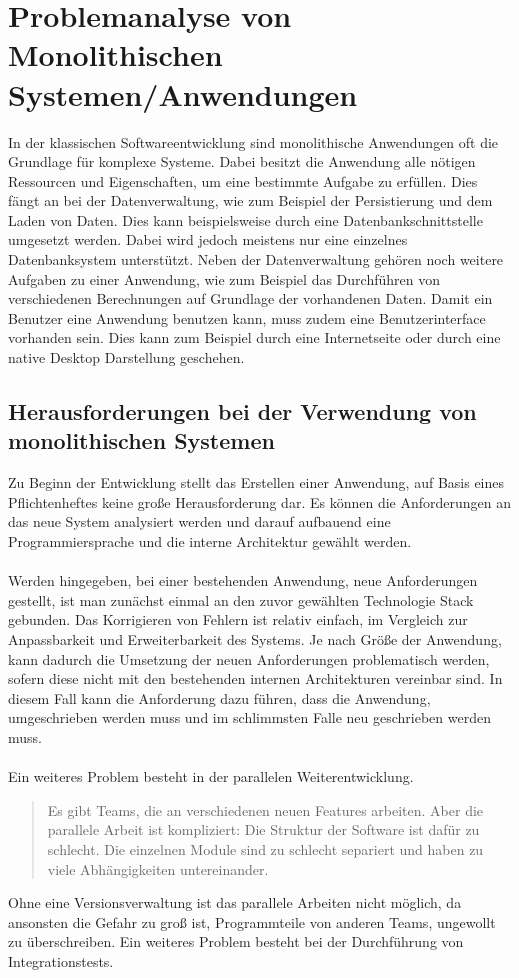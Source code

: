 \chapter{Problemanalyse von Monolithischen Systemen/Anwendungen}
\label{chap:ProblemanalyseMonolithischeSysteme}
In der klassischen Softwareentwicklung sind monolithische Anwendungen oft die Grundlage für komplexe Systeme. Dabei besitzt die Anwendung alle nötigen Ressourcen und Eigenschaften, um eine bestimmte Aufgabe zu erfüllen. Dies fängt an bei der Datenverwaltung, wie zum Beispiel der Persistierung und dem Laden von Daten. Dies kann beispielsweise durch eine Datenbankschnittstelle umgesetzt werden. Dabei wird jedoch meistens nur eine einzelnes Datenbanksystem unterstützt. Neben der Datenverwaltung gehören noch weitere Aufgaben zu einer Anwendung, wie zum Beispiel das Durchführen von verschiedenen Berechnungen auf Grundlage der vorhandenen Daten. Damit ein Benutzer eine Anwendung benutzen kann, muss zudem eine Benutzerinterface vorhanden sein. Dies kann zum Beispiel durch eine Internetseite  oder durch eine native Desktop Darstellung geschehen.

\section{Herausforderungen bei der Verwendung von monolithischen Systemen}
\label{sec:HerausforderungenMonolithisch}
Zu Beginn der Entwicklung stellt das Erstellen einer Anwendung, auf Basis eines Pflichtenheftes keine große Herausforderung dar. Es können die Anforderungen an das neue System analysiert werden und darauf aufbauend eine Programmiersprache und die interne Architektur gewählt werden.
\\\\
Werden hingegeben, bei einer bestehenden Anwendung, neue Anforderungen gestellt, ist man zunächst einmal an den zuvor gewählten Technologie Stack gebunden. Das Korrigieren von Fehlern ist relativ einfach, im Vergleich zur Anpassbarkeit und Erweiterbarkeit des Systems. Je nach Größe der Anwendung, kann dadurch die Umsetzung der neuen Anforderungen problematisch werden, sofern diese nicht mit den bestehenden internen Architekturen vereinbar sind. In diesem Fall kann die Anforderung dazu führen, dass die Anwendung, umgeschrieben werden muss und im schlimmsten Falle neu geschrieben werden muss.
\\\\
Ein weiteres Problem besteht in der parallelen Weiterentwicklung.
\begin{quotation}
    \frqq Es gibt Teams, die an verschiedenen neuen Features arbeiten. Aber die parallele Arbeit ist kompliziert: Die Struktur der Software ist dafür zu schlecht. Die einzelnen Module sind zu schlecht separiert und haben zu viele Abhängigkeiten untereinander. \flqq\ \cite[S. 16]{EWolff2016:Microservices}
\end{quotation}
Ohne eine Versionsverwaltung ist das parallele Arbeiten nicht möglich, da ansonsten die Gefahr zu groß ist, Programmteile von anderen Teams, ungewollt zu überschreiben. Ein weiteres Problem besteht bei der Durchführung von Integrationstests.

